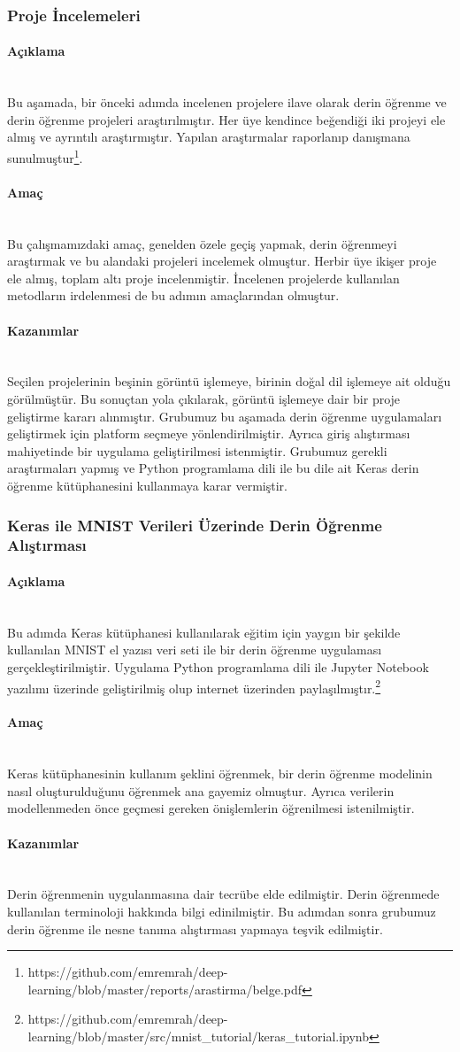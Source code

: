 \documentclass[12pt,a4paper]{article}
\newcommand{\subsubsubsection}[1]{\paragraph{#1}\mbox{}\\}
\begin{document}
    \subsubsection{Proje İncelemeleri}
    \subsubsubsection{Açıklama}
    Bu aşamada, bir önceki adımda incelenen projelere ilave olarak derin öğrenme ve derin öğrenme projeleri araştırılmıştır. Her üye kendince beğendiği iki projeyi ele almış
    ve ayrıntılı araştırmıştır. Yapılan araştırmalar raporlanıp danışmana sunulmuştur\footnote{https://github.com/emremrah/deep-learning/blob/master/reports/arastirma/belge.pdf}.

    \subsubsubsection{Amaç}
    Bu çalışmamızdaki amaç, genelden özele geçiş yapmak, derin öğrenmeyi araştırmak ve bu alandaki projeleri incelemek olmuştur. Herbir üye ikişer proje ele almış, toplam altı proje incelenmiştir. 
    İncelenen projelerde kullanılan metodların irdelenmesi de bu adımın amaçlarından olmuştur.

    \subsubsubsection{Kazanımlar}
    Seçilen projelerinin beşinin görüntü işlemeye, birinin doğal dil işlemeye ait olduğu görülmüştür. Bu sonuçtan yola çıkılarak, görüntü işlemeye dair bir proje geliştirme kararı alınmıştır.
    Grubumuz bu aşamada derin öğrenme uygulamaları geliştirmek için platform seçmeye yönlendirilmiştir. Ayrıca giriş alıştırması mahiyetinde bir uygulama geliştirilmesi istenmiştir.
    Grubumuz gerekli araştırmaları yapmış ve Python programlama dili ile bu dile ait Keras derin öğrenme kütüphanesini kullanmaya karar vermiştir.

    \subsubsection{Keras ile MNIST Verileri Üzerinde Derin Öğrenme Alıştırması}
    \subsubsubsection{Açıklama}
    Bu adımda Keras kütüphanesi kullanılarak eğitim için yaygın bir şekilde kullanılan MNIST el yazısı veri seti ile bir derin öğrenme uygulaması gerçekleştirilmiştir. 
    Uygulama Python programlama dili ile Jupyter Notebook yazılımı üzerinde geliştirilmiş olup internet üzerinden paylaşılmıştır.\footnote{https://github.com/emremrah/deep-learning/blob/master/src/mnist\_tutorial/keras\_tutorial.ipynb}
    \subsubsubsection{Amaç}
    Keras kütüphanesinin kullanım şeklini öğrenmek, bir derin öğrenme modelinin nasıl oluşturulduğunu öğrenmek ana gayemiz olmuştur. Ayrıca verilerin modellenmeden önce geçmesi gereken önişlemlerin
    öğrenilmesi istenilmiştir.

    \subsubsubsection{Kazanımlar}
    Derin öğrenmenin uygulanmasına dair tecrübe elde edilmiştir. Derin öğrenmede kullanılan terminoloji hakkında bilgi edinilmiştir. Bu adımdan sonra grubumuz derin öğrenme ile nesne tanıma alıştırması
    yapmaya teşvik edilmiştir.
\end{document}
